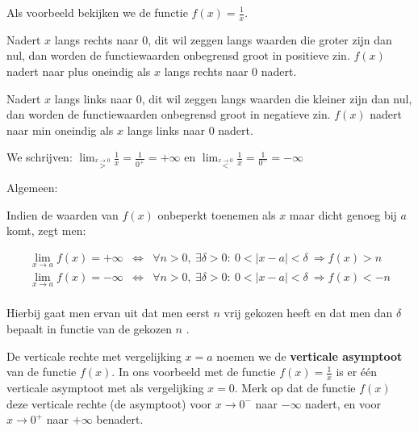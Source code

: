 \begin{voorbeeld}
Als voorbeeld bekijken we de functie
$f(x)=\frac{1}{x}$.


Nadert $x$ langs rechts naar $0$, dit wil zeggen langs
waarden die groter zijn dan nul, dan worden de functiewaarden onbegrensd
groot in positieve zin. $f(x)$ nadert naar plus oneindig als $x$
langs rechts naar $0$ nadert. 

Nadert $x$ langs links naar $0$, dit wil zeggen langs
waarden die kleiner zijn dan nul, dan worden de functiewaarden onbegrensd
groot in negatieve zin. $f(x)$ nadert naar min oneindig als $x$
langs links naar $0$ nadert.


We schrijven: ${\displaystyle \lim_{\overset{x\rightarrow0}{>}}}{\displaystyle \frac{1}{x}}={\displaystyle \frac{1}{0^{+}}}=+\infty$
en ${\displaystyle \lim_{\overset{x\rightarrow0}{<}}}{\displaystyle \frac{1}{x}}={\displaystyle \frac{1}{0^{-}}}=-\infty$

\end{voorbeeld}
Algemeen:

Indien de waarden van $f(x)$ onbeperkt toenemen als $x$ maar dicht
genoeg bij $a$ komt, zegt men:

\begin{eqnarray*}
{\displaystyle \lim_{x\to a}}f(x)=+\infty & \Leftrightarrow & \forall n>0,\:\exists\delta>0:\:0<\left|x-a\right|<\delta\:\Rightarrow f(x)>n\\
{\displaystyle \lim_{x\to a}}f(x)=-\infty & \Leftrightarrow & \forall n>0,\:\exists\delta>0:\:0<\left|x-a\right|<\delta\:\Rightarrow f(x)<-n\\
\end{eqnarray*}

Hierbij gaat men ervan uit dat men eerst $n$ vrij gekozen heeft en
dat men dan $\delta$ bepaalt in functie van de gekozen $n$ .

De verticale rechte met vergelijking $x=a$ noemen we de \textbf{verticale
asymptoot} van de functie $f(x)$. In ons voorbeeld met de functie
$f(x)={\displaystyle \frac{1}{x}}$ is er \'e\'en verticale asymptoot
met als vergelijking $x=0$. Merk op dat de functie $f(x)$ deze verticale
rechte (de asymptoot) voor $x\rightarrow0^{-}$ naar $-\infty$ nadert,
en voor $x\rightarrow0^{+}$ naar $+\infty$ benadert.

